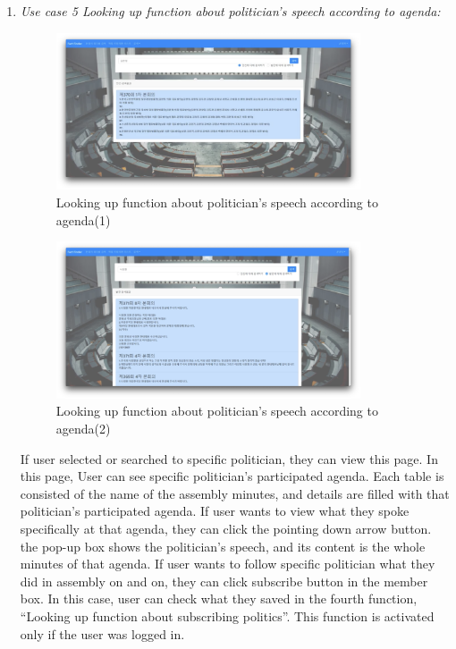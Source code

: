 \documentclass[conference]{IEEEtran}
\begin{document}
\begin{enumerate}
\clearpage

\item \textit{Use case 5  Looking up function about politician’s speech according to agenda:}

\begin{figure}[htbp]
\centerline{\includegraphics[width=90mm,scale=0.5]{fig/usecase10.png}}
\caption{Looking up function about politician's speech according to agenda(1)}
\label{fig}
\end{figure}

\begin{figure}[htbp]
\centerline{\includegraphics[width=90mm,scale=0.5]{fig/usecase11.png}}
\caption{Looking up function about politician's speech according to agenda(2)}
\label{fig}
\end{figure}


 If user selected or searched to specific politician, they can view this page. In this page, User can see specific politician’s participated agenda. Each table is consisted of the name of the assembly minutes, and details are filled with that politician’s participated agenda. If user wants to view what they spoke specifically at that agenda, they can click the pointing down arrow button. the pop-up box shows the politician’s speech, and its content is the whole minutes of that agenda.
 If user wants to follow specific politician what they did in assembly on and on, they can click subscribe button in the member box. In this case, user can check what they saved in the fourth function, “Looking up function about subscribing politics”. This function is activated only if the user was logged in.\\


\end{enumerate}
\end{document}
